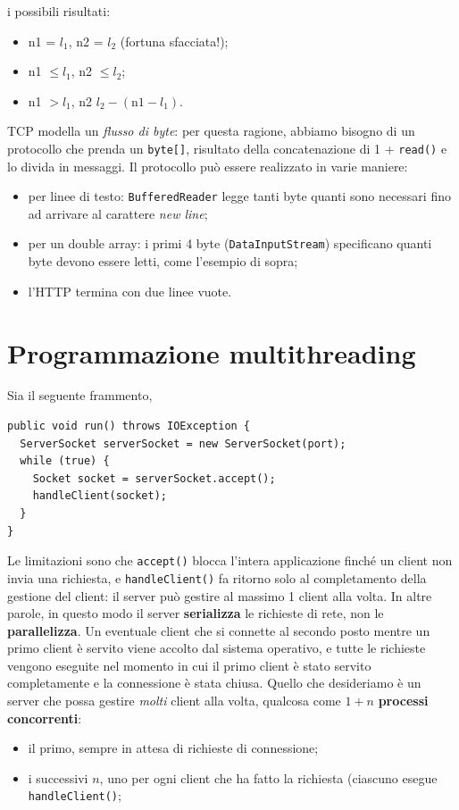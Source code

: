 \documentclass[\fontsizeclass,twocolumn]{\classname}
\theoremstyle{definition}
\theoremstyle{definition}
\begin{document}
i possibili risultati:
\begin{itemize}
    \item n1 = $l_1$, n2 = $l_2$ (fortuna sfacciata!);
    \item n1 $\leq l_1$, n2 $\leq l_2$;
    \item n1 $> l_1$, n2 $l_2 - (\mathrm{ n1 } - l_1)$.
\end{itemize}

TCP modella un \emph{flusso di byte}: per questa ragione, abbiamo bisogno di un
protocollo che prenda un \texttt{byte[]}, risultato della concatenazione di 1 +
\texttt{read()} e lo divida in messaggi. Il protocollo può essere realizzato in
varie maniere:
\begin{itemize}
    \item per linee di testo: \texttt{BufferedReader} legge tanti byte quanti
        sono necessari fino ad arrivare al carattere \emph{new line};
    \item per un double array: i primi 4 byte (\texttt{DataInputStream})
        specificano quanti byte devono essere letti, come l'esempio di sopra;
    \item l'HTTP termina con due linee vuote.
\end{itemize}

\chapter{Programmazione multithreading}

Sia il seguente frammento,

\begin{lstlisting}
public void run() throws IOException {
  ServerSocket serverSocket = new ServerSocket(port);
  while (true) {
    Socket socket = serverSocket.accept();
    handleClient(socket);
  }
}
\end{lstlisting}

Le limitazioni sono che \texttt{ac\-cept()} blocca l'intera applicazione finché
un client non invia una richiesta, e \texttt{handleClient()} fa ritorno solo al
completamento della gestione del client: il server può gestire al massimo 1
client alla volta. In altre parole, in questo modo il server
\textbf{serializza} le richieste di rete, non le \textbf{parallelizza}. Un
eventuale client che si connette al secondo posto mentre un primo client è
servito viene accolto dal sistema operativo, e tutte le richieste vengono
eseguite nel momento in cui il primo client è stato servito completamente e la
connessione è stata chiusa. Quello che desideriamo è un server che possa gestire \emph{molti} client alla volta, qualcosa come $1 + n$ \textbf{processi concorrenti}:
\begin{itemize}
    \item il primo, sempre in attesa di richieste di connessione;
    \item i successivi $n$, uno per ogni client che ha fatto la richiesta
        (ciascuno esegue \texttt{handleClient()};
\end{itemize}
\end{document}
